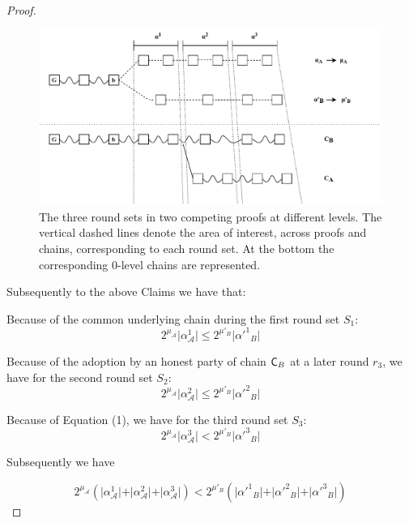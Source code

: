 \begin{proof}
	\begin{figure}[h]
		\begin{center}
			\includegraphics[width=0.9\columnwidth]{figures/claim3.pdf}
		\end{center}
		\caption{The three round sets in two competing proofs at different levels.
		The vertical dashed lines denote the area of interest, across proofs and chains,
		corresponding to each round set. At the bottom the corresponding 0-level chains
		are represented.}
		\label{fig:claim3}
	\end{figure}

	Subsequently to the above Claims we have that:

	Because of the common underlying chain during the first round set $S_1$:
	\begin{equation} \label{eq_round_set_1}
	2^{\mu_\mathcal{A}} \vert \alpha^1_\mathcal{A} \vert \leq 2^{\mu'_B} \vert \alpha'^1{_B} \vert
	\end{equation}

	Because of the adoption by an honest party of chain $\mathsf{C}_B$ at a later round $r_3$, 
	we have for the second round set $S_2$:
	\begin{equation} \label{eq_round_set_2}
	2^{\mu_\mathcal{A}} \vert \alpha^2_\mathcal{A} \vert \leq 2^{\mu'_B} \vert \alpha'^2{_B} \vert
	\end{equation}

	Because of Equation (1), we have for the third round set $S_3$:
	\begin{equation} \label{eq_round_set_3}
	2^{\mu_\mathcal{A}} \vert \alpha^3_\mathcal{A} \vert < 2^{\mu'_B} \vert \alpha'^3{_B} \vert
	\end{equation}

	Subsequently we have

	\begin{equation*}
	2^{\mu_\mathcal{A}} ( \vert \alpha^1_\mathcal{A} \vert + \vert \alpha^2_\mathcal{A} \vert + \vert
	\alpha^3_\mathcal{A} \vert ) < 2^{\mu'_B} ( \vert \alpha'^1{_B} \vert + \vert
	\alpha'^2{_B} \vert + \vert \alpha'^3{_B} \vert)
	\end{equation*}


\end{proof}
